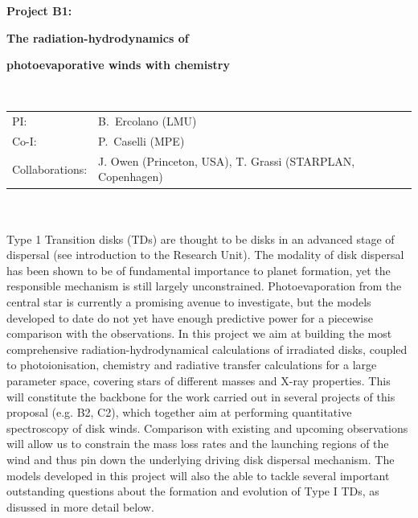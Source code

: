 \documentclass[10pt,fleqn,twoside]{article}
\begin{document}
\newpage


\setcounter{page}{1}

\centerline{\huge\bf\Tcol
%
%
%
%
%
 Project B1:}
\vspace{1em}

\centerline{\LARGE\bf\Tcol The radiation-hydrodynamics of}\vspace{0.3em}
\centerline{\LARGE\bf\Tcol photoevaporative winds with chemistry}

%
%
%
%
%
\vskip1.0cm

\\
\begin{tabular}{ll}
{\textsf{PI:}}                  & B.~Ercolano (LMU)\\
{\textsf{Co-I:}}                &P.~Caselli (MPE)\\
{\textsf{Collaborations:}}      & J. Owen (Princeton, USA), T. Grassi (STARPLAN, Copenhagen)  \
\end{tabular}


\vspace{1em}
 \\

\vspace{1em}
\\
Type 1 Transition disks (TDs) are thought to be disks in an advanced stage of dispersal
(see introduction to the Research Unit). The
modality of disk dispersal has been shown to be of fundamental importance to planet
formation, yet the responsible mechanism is still largely
unconstrained. Photoevaporation from the central star is currently a
promising avenue to investigate, but the models developed to date do
not yet have enough predictive power for a piecewise comparison with
the observations. In this project we aim at building the most
comprehensive radiation-hydrodynamical calculations of irradiated disks, 
coupled to photoionisation, chemistry and radiative transfer
calculations for a large parameter space, covering stars of different
masses and X-ray properties. This will constitute the backbone for the work carried
out in several projects of this proposal (e.g. B2, C2), which together
aim at performing quantitative
spectroscopy of disk winds. Comparison with existing and upcoming
observations will allow us to constrain the mass loss rates and the
launching regions of the wind and thus pin down the underlying driving disk
dispersal mechanism. 
The models developed in this project will also the able to tackle
several important outstanding questions about the formation and evolution of
Type I TDs, as disussed in more detail below. 
\end{document}
